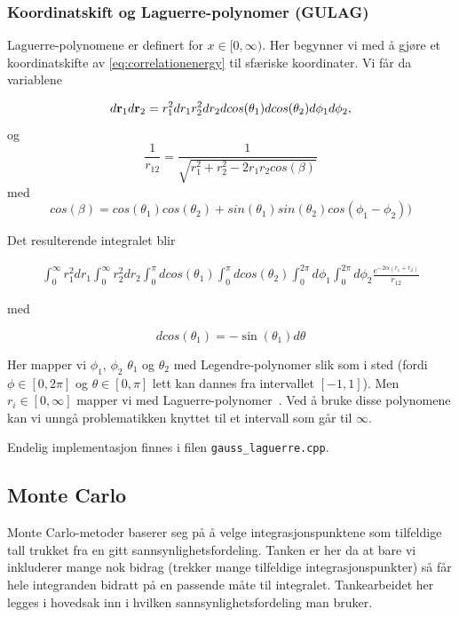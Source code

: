 \documentclass[11pt]{article}
\begin{document}
\subsubsection{Koordinatskift og Laguerre-polynomer (GULAG)}
\label{susubsec:gauss-laguerre}
Laguerre-polynomene er definert for $x\in[0,\infty)$. Her begynner vi med å gjøre et koordinatskifte av 
\eqref{eq:correlationenergy} til sfæriske koordinater. Vi får da variablene

\[
   d{\bf r}_1d{\bf r}_2  = r_1^2dr_1 r_2^2dr_2 dcos(\theta_1)dcos(\theta_2)d\phi_1d\phi_2,
\]
og
\[
   \frac{1}{r_{12}}= \frac{1}{\sqrt{r_1^2+r_2^2-2r_1r_2cos(\beta)}}
\]
med 
\[
cos(\beta) = cos(\theta_1)cos(\theta_2)+sin(\theta_1)sin(\theta_2)cos(\phi_1-\phi_2))
\]

Det resulterende integralet blir

\begin{align}
\int_{0}^{\infty} r_1^2 dr_1 \int_{0}^{\infty} r_2^2 dr_2
\int_{0}^{\pi} dcos(\theta_1) \int_{0}^{\pi} dcos(\theta_2)
\int_{0}^{2\pi} d\phi_1 \int_{0}^{2\pi} d\phi_2 \frac{e^{-2\alpha (r_1+r_2)}}{r_{12}}\label{eq:int-spherical}
\end{align}

med

\[
dcos(\theta_1) = -\sin(\theta_1)d\theta
\]

Her mapper vi $\phi_1$, $\phi_2$ $\theta_1$ og $\theta_2$ med
Legendre-polynomer slik som i sted (fordi $\phi\in[0,2\pi]$ og
$\theta\in[0,\pi]$ lett kan dannes fra intervallet $[-1,1]$).
Men $ r_i \in [0, \infty] $ mapper vi med
Laguerre-polynomer~\cite{Lecture-notes}\cite{laguerre-poly-wiki}. Ved å bruke disse polynomene
kan vi unngå problematikken knyttet til et intervall som går til
$\infty$.

Endelig implementasjon finnes i filen \texttt{gauss\_laguerre.cpp}.


\subsection{Monte Carlo}
\label{subsec:monte-carlo}
Monte Carlo-metoder baserer seg på å velge integrasjonspunktene som
tilfeldige tall trukket fra en gitt sannsynlighetsfordeling. Tanken er
her da at bare vi inkluderer mange nok bidrag (trekker mange
tilfeldige integrasjonspunkter) så får hele integranden bidratt på en
passende måte til integralet. Tankearbeidet her legges i hovedsak inn
i hvilken sannsynlighetsfordeling man bruker.
\end{document}
